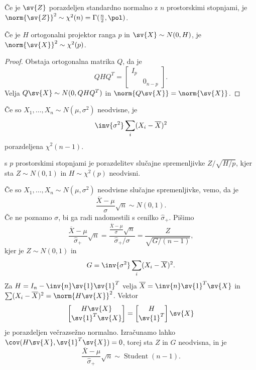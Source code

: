 Če je $\sv{Z}$ porazdeljen standardno normalno z $n$ prostorskimi stopnjami,
je $\norm{\sv{Z}}^2 \sim \chi^2(n) = \Gamma(\frac{n}{2}, \pol)$.

\begin{trditev}
  Če je $H$ ortogonalni projektor ranga $p$ in $\sv{X} \sim N(0, H)$, je
  $\norm{\sv{X}}^2 \sim \chi^2(p)$.
\end{trditev}

\begin{proof}
  Obstaja ortogonalna matrika $Q$, da je
  \[
	Q H Q^T =
	\begin{bmatrix}
	  I_p &  \\
	   & 0_{n-p}
	\end{bmatrix}.
  \]
  Velja $Q \sv{X} \sim N(0, Q H Q^T)$ in $\norm{Q \sv{X}} = \norm{\sv{X}}$.
\end{proof}


\begin{opomba}
  Če so $X_1, \ldots, X_n \sim N(\mu, \sigma^2)$ neodvisne, je
  \[
	\inv{\sigma^2} \sum_i (X_i - \overline{X})^2
  \]
  porazdeljena $\chi^2(n-1)$.
\end{opomba}

\begin{definicija}
   s $p$ prostorskimi stopnjami je porazdelitev
  slučajne spremenljivke $Z / \sqrt{H/p}$, kjer sta $Z \sim N(0,1)$ in $H \sim
  \chi^2(p)$ neodvisni.
\end{definicija}


Če so $X_1, \ldots, X_n \sim N(\mu, \sigma^2)$ neodvisne slučajne spremenljivke,
vemo, da je
\[
  \frac{\overline{X} - \mu}{\sigma} \sqrt{n} \sim N(0,1).
\]
Če ne poznamo $\sigma$, bi ga radi nadomestili s cenilko $\hat{\sigma}_+$.
Pišimo
\[
  \frac{\overline{X} - \mu}{\hat{\sigma}_+} \sqrt{n}
  = \frac{\frac{\overline{X} - \mu}{\sigma} \sqrt{n}}{\hat{\sigma}_+ / \sigma}
  = \frac{Z}{\sqrt{G / (n-1)}},
\]
kjer je $Z \sim N(0,1)$ in
\[
  G = \inv{\sigma^2} \sum_i (X_i - \overline{X})^2.
\]
Za $H = I_n - \inv{n} \sv{1} \sv{1}^T$ velja $\overline{X} = \inv{n} \sv{1}^T
\sv{X}$ in $\sum (X_i - \overline{X})^2 = \norm{H \sv{X}}^2$.
Vektor
\[
  \begin{bmatrix}
	H \sv{X} \\ \sv{1}^T \sv{X}
  \end{bmatrix}
  =
  \begin{bmatrix}
	H \\ \sv{1}^T
  \end{bmatrix}
  \sv{X}
\]
je porazdeljen večrazsežno normalno.
Izračunamo lahko $\cov(H \sv{X}, \sv{1}^T \sv{X}) = 0$, torej sta $Z$ in $G$
neodvisna, in je
\[
  \frac{\overline{X} - \mu}{\hat{\sigma}_+} \sqrt{n}
  \sim \operatorname{Student}(n-1).
\]


